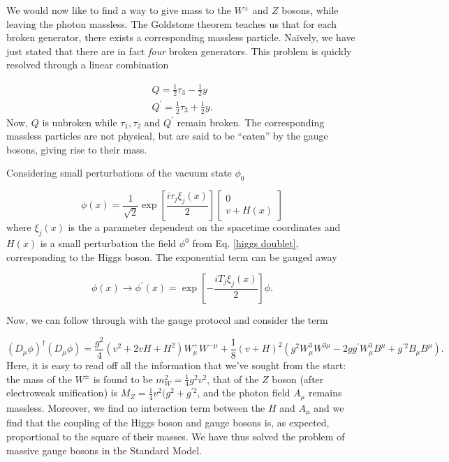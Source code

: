 \documentclass[10pt,a4paper]{book}
\begin{document}
We would now like to find a way to give mass to the $W^\pm$ and $Z$ bosons, while leaving the photon massless. The Goldstone theorem teaches us that for each broken generator, there exists a corresponding massless particle. Na\"{i}vely, we have just stated that there are in fact \emph{four} broken generators. This problem is quickly resolved through a linear combination

\begin{gather}
    Q = \frac{1}{2}\tau_3 - \frac{1}{2}y \\
    Q^\prime =  \frac{1}{2}\tau_3 + \frac{1}{2}y.
\end{gather}
Now, $Q$ is unbroken while $\tau_1, \tau_2$ and $Q^\prime$ remain broken. The corresponding massless particles are not physical, but are said to be ``eaten'' by the gauge bosons, giving rise to their mass. 

Considering small perturbations of the vacuum state $\phi_0$

\begin{equation}
    \phi (x) = \frac{1}{\sqrt{2}}\exp\left[\frac{i\tau_j\xi_j(x)}{2} \right]\begin{bmatrix}
0 \\
v + H(x)
\end{bmatrix}
\end{equation}
where $\xi_j(x)$ is the a parameter dependent on the spacetime coordinates and $H(x)$ is a small perturbation the field $\phi^0$ from Eq. \ref{higgs doublet}, corresponding to the Higgs boson. The exponential term can be gauged away

\begin{equation}
    \phi (x) \rightarrow \phi^\prime (x) = \exp\left[-\frac{iT_j\xi_j(x)}{2} \right]\phi.
\end{equation}

Now, we can follow through with the gauge protocol and consider the term

\begin{equation}
(D_\mu\phi)^\dagger(D_\mu\phi) = \frac{g^2}{4}\left(v^2 + 2vH + H^2\right)W^+_\mu W^{- \mu} + \frac{1}{8}(v + H)^2 \left( g^2 W^3_\mu W^{3\mu} - 2gg^\prime W^3_\mu B^\mu + g^{\prime 2}B_\mu B^\mu \right).
\end{equation}
Here, it is easy to read off all the information that we've sought from the start: the mass of the $W^\pm$ is found to be $m_W^2 = \frac{1}{4}g^2v^2$, that of the $Z$ boson (after electroweak unification) is $M_Z = \frac{1}{4}v^2(g^2+g^{\prime 2}$, and the photon field $A_\mu$ remains massless. Moreover, we find no interaction term between the $H$ and $A_\mu$ and we find that the coupling of the Higgs boson and gauge bosons is, as expected, proportional to the square of their masses. We have thus solved the problem of massive gauge bosons in the Standard Model.
\end{document}
